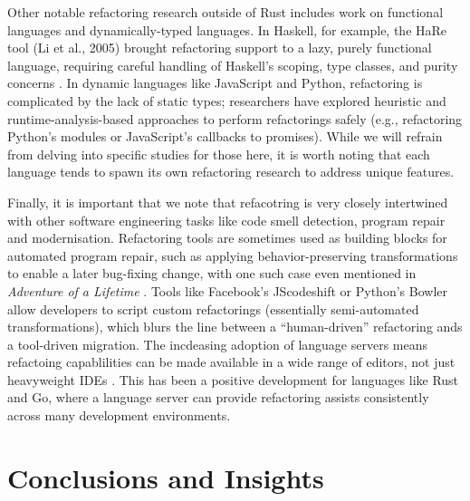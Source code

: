 Other notable refactoring research outside of Rust includes work on functional
languages and dynamically-typed languages. In Haskell, for example, the HaRe
tool (Li et al., 2005) brought refactoring support to a lazy, purely functional
language, requiring careful handling of Haskell's scoping, type classes, and
purity concerns \cite{HaRe}. In dynamic languages like JavaScript and Python, refactoring is
complicated by the lack of static types; researchers have explored heuristic and
runtime-analysis-based approaches to perform refactorings safely (e.g.,
refactoring Python's modules or JavaScript's callbacks to promises). While we
will refrain from delving into specific studies for those here, it is worth noting that each
language tends to spawn its own refactoring research to address unique features.

Finally, it is important that we note that refacotring is very closely
intertwined with other software engineering tasks like code smell detection,
program repair and modernisation. Refactoring tools are sometimes used as
building blocks for automated program repair, such as applying
behavior-preserving transformations to enable a later bug-fixing change, with
one such case even mentioned in
\textit{Adventure of a Lifetime} \cite{AdventureOfALifetime}. Tools like
Facebook's JScodeshift or Python's Bowler allow developers to script custom
refactorings (essentially semi-automated transformations), which blurs the line
between a ``human-driven'' refactoring ands a tool-driven migration. The
incdeasing adoption of language servers means refactoing capablilities can be
made available in a wide range of editors, not just heavyweight IDEs
\cite{AdventureOfALifetime}. This has been a positive development for languages
like Rust and Go, where a language server can provide refactoring assists
consistently across many development environments.

\section{Conclusions and Insights}
\label{sec:lit_concusions}

\renewcommand\thefigure{\thechapter .\arabic{figure}}